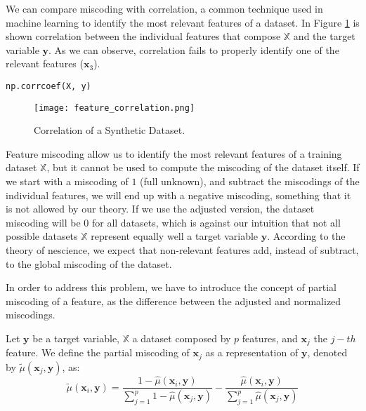 \begin{example}
We can compare miscoding with correlation, a common technique used in machine learning to identify the most relevant features of a dataset. In Figure \ref{figure:correlation_make_classification} is shown correlation between the individual features that compose $\mathbb{X}$ and the target variable $\mathbf{y}$. As we can observe, correlation fails to properly identify one of the relevant features ($\mathbf{x}_3$).

\begin{sourcecode}
{\scriptsize \begin{verbatim}
np.corrcoef(X, y)
\end{verbatim}}
\end{sourcecode}

\begin{figure}[h]
\centering
\texttt{[image: feature\_correlation.png]}
\caption{Correlation of a Synthetic Dataset.}
\label{figure:correlation_make_classification}
\end{figure}

\end{example}

Feature miscoding allow us to identify the most relevant features of a training dataset $\mathbb{X}$, but it cannot be used to compute the miscoding of the dataset itself. If we start with a miscoding of $1$ (full unknown), and subtract the miscodings of the individual features, we will end up with a negative miscoding, something that it is not allowed by our theory. If we use the adjusted version, the dataset miscoding will be $0$ for all datasets, which is against our intuition that not all possible datasets $\mathbb{X}$ represent equally well a target variable $\mathbf{y}$. According to the theory of nescience, we expect that non-relevant features add, instead of subtract, to the global miscoding of the dataset.

In order to address this problem, we have to introduce the concept of partial miscoding of a feature, as the difference between the adjusted and normalized miscodings.

\begin{definition}
Let $\mathbf{y}$ be a target variable, $\mathbb{X}$ a dataset composed by $p$ features, and $\mathbf{x}_j$ the $j-th$ feature. We define the partial miscoding of $\mathbf{x}_j$ as a representation of $\mathbf{y}$, denoted by $\tilde\mu(\mathbf{x}_j, \mathbf{y})$, as:
\[
\tilde\mu(\mathbf{x}_i, \mathbf{y}) = \frac{ 1 - \hat\mu(\mathbf{x}_i, \mathbf{y}) } { \sum_{j=1}^p 1 - \hat\mu(\mathbf{x}_j, \mathbf{y}) } - \frac{\hat\mu(\mathbf{x}_i, \mathbf{y}) } { \sum_{j=1}^p \hat\mu(\mathbf{x}_j, \mathbf{y}) }
\]
\end{definition}

